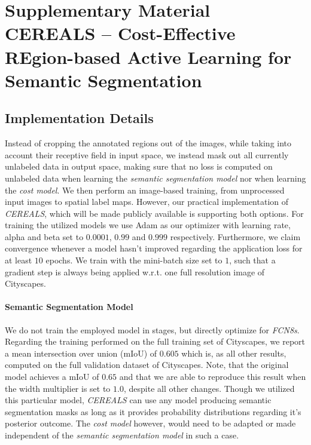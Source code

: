 \documentclass{bmvc2k}
\begin{document}


\clearpage

\appendix

\section{Supplementary Material \newline CEREALS -- Cost-Effective REgion-based Active Learning for Semantic Segmentation}

\subsection{Implementation Details}
\label{appendix:impl_details}

Instead of cropping the annotated regions out of the images, while taking into account their receptive field in input space, we instead mask out all currently unlabeled data in output space, making sure that no loss is computed on unlabeled data when learning the \textit{semantic segmentation model} nor when learning the \textit{cost model}. We then perform an image-based training, from unprocessed input images to spatial label maps. However, our practical implementation of \textit{CEREALS}, which will be made publicly available is supporting both options. For training the utilized models we use Adam as our optimizer with learning rate, alpha and beta set to $0.0001$, $0.99$ and $0.999$ respectively. Furthermore, we claim convergence whenever a model hasn't improved regarding the application loss for at least $10$ epochs. We train with the mini-batch size set to $1$, such that a gradient step is always being applied w.r.t. one full resolution image of Cityscapes.

\paragraph{Semantic Segmentation Model}
We do not train the employed model in stages, but directly optimize for \textit{FCN8s}. Regarding the training performed on the full training set of Cityscapes, we report a mean intersection over union (mIoU) of $0.605$ which is, as all other results, computed on the full validation dataset of Cityscapes. Note, that the original model achieves a mIoU of $0.65$ and that we are able to reproduce this result when the width multiplier is set to $1.0$, despite all other changes. Though we utilized this particular model, \textit{CEREALS} can use any model producing semantic segmentation masks as long as it provides probability distributions regarding it's posterior outcome. The \textit{cost model} however, would need to be adapted or made independent of the \textit{semantic segmentation model} in such a case. 
\end{document}
